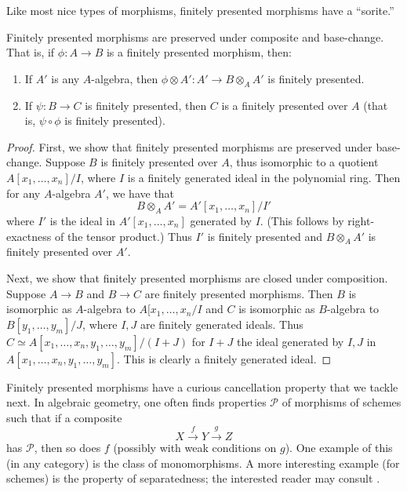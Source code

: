 Like most nice types of morphisms, finitely presented morphisms have a
``sorite.''
\begin{proposition}
Finitely presented morphisms are preserved under composite and base-change.
That is, if $\phi: A \to B$ is a finitely presented morphism, then:
\begin{enumerate}
\item If $A'$ is any $A$-algebra, then $\phi \otimes A': A' \to B \otimes_A
A'$ is finitely presented. 
\item If $\psi: B \to C$ is finitely presented, then $C$ is a finitely
presented over $A$ (that is, $\psi \circ \phi$ is finitely presented).
\end{enumerate}
\end{proposition} 
\begin{proof} 
First, we show that finitely presented morphisms are preserved under base-change. 
Suppose $B$ is finitely presented over $A$, thus isomorphic to a quotient $A[x_1, \dots,
x_n]/I$, where $I$ is a finitely generated ideal in the polynomial ring. Then
for any $A$-algebra $A'$, we have that 
\[ B \otimes_A A' = A'[x_1, \dots, x_n]/ I'  \]
where $I'$ is the ideal in $A'[x_1, \dots, x_n]$ generated by $I$. (This
follows by right-exactness of the tensor product.) Thus $I'$ is finitely
presented and $B \otimes_A A'$ is finitely presented over $A'$.

Next, we show that finitely presented morphisms are closed under composition.
Suppose $A \to B$ and $B \to C$ are finitely presented morphisms. Then $B$ is isomorphic as
$A$-algebra to $A[x_1, \dots, x_n/I$ and $C$ is isomorphic as $B$-algebra to
$B[y_1, \dots, y_m]/J$, where $I, J$ are finitely generated ideals.
Thus $C \simeq A[x_1, \dots, x_n, y_1, \dots, y_m]/(I+J)$ for $I+J$ the ideal
generated by $I, J$ in $A[x_1, \dots, x_n, y_1, \dots, y_m]$.  This is clearly a
finitely generated ideal.
\end{proof} 

Finitely presented morphisms have a curious cancellation property that we
tackle next. In algebraic geometry, one often finds properties $\mathcal{P}$ of morphisms 
of schemes such that if a composite
\[ X \stackrel{f}{\to} Y \stackrel{g}{\to} Z \]
has $\mathcal{P}$, then so does $f$ (possibly with weak conditions on $g$). 
One example of this (in any category) is the class of monomorphisms.  A more
interesting example (for schemes) is the property of separatedness; the
interested reader
may consult \cite{EGA}.

